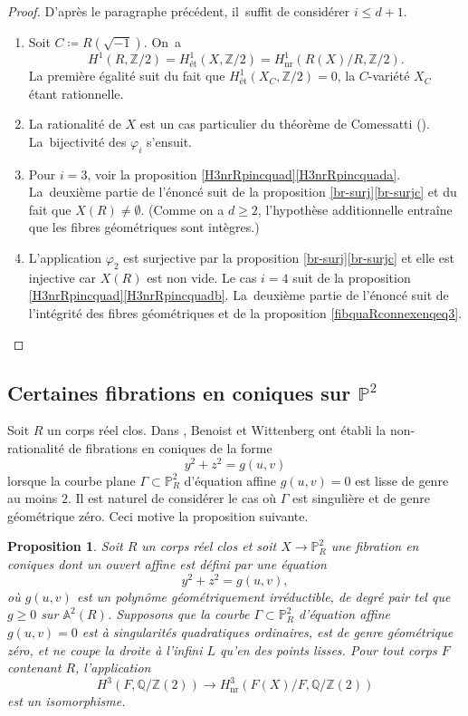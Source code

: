 \documentclass[JEP,XML,SOM,Unicode,francais,published]{cedram}
\newenvironment{enumeratea}
{\bgroup\def\theenumi{\alph{enumi}}\begin{enumerate}}
{\end{enumerate}\egroup}
\newtheorem{prop}[thm]{Proposition}
\theoremstyle{definition}
\newcommand{\Q}{\mathbb Q}
\newcommand{\Z}{\mathbb Z}
\newcommand{\A}{\mathbb A}
\renewcommand{\P}{\mathbb P}
\newcommand{\on}[1]{\operatorname{#1}}
\let\phi\varphi
\begin{document}
\begin{proof}
D'après le paragraphe précédent, il~suffit de considérer $i\leq d+1$.

\begin{enumeratea}
\item\label{pf:a}
Soit $C\coloneqq R(\sqrt{-1})$. On~a
\[H^1(R,\Z/2)=H^1_{\text{ét}}(X,\Z/2)=H^1_{\on{nr}}(R(X)/R,\Z/2).\]
La première égalité suit du fait que $H^1_{\text{ét}}(X_C,\Z/2)=0$, la $C$-variété $X_C$ étant rationnelle.

\item\label{pf:b}
La rationalité de $X$ est un cas particulier du théorème de Comessatti \cite{comessatti1912fondamenti} (\cf \cite[\S10.2]{colliot2024certaines}). La~bijectivité des $\phi_i$ s'ensuit.

\item\label{pf:c}
Pour $i=3$, voir la proposition \ref{H3nrRpincquad}\eqref{H3nrRpincquada}. La~deuxième partie de l'énoncé suit de la proposition \ref{br-surj}\eqref{br-surjc} et du fait que $X(R)\neq \emptyset$. (Comme on a $d\geq 2$, l'hypothèse additionnelle entraîne que les fibres géométriques sont intègres.)

\item\label{pf:d}
L'application $\phi_2$ est surjective par la proposition \ref{br-surj}\eqref{br-surjc} et elle est injective car $X(R)$ est non vide. Le cas $i=4$ suit de la proposition \ref{H3nrRpincquad}\eqref{H3nrRpincquadb}. La~deuxième partie de l'énoncé suit de l’intégrité des fibres géométriques et de la proposition \ref{fibquaRconnexenqeq3}.\qedhere
\end{enumeratea}
\end{proof}

\subsection{Certaines fibrations en coniques sur \texorpdfstring{$\P^2$}{P2}}
Soit $R$ un corps réel clos. Dans \cite[Prop.\,3.4, Cor.\,3.6]{benoist2020clemens}, Benoist et Wittenberg ont établi la non-rationalité de fibrations en coniques de la forme
\[
y^2+z^2=g(u,v)
\]
lorsque la courbe plane $\Gamma\subset \P^2_R$ d'équation affine $g(u,v)=0$ est lisse de genre au moins $2$. Il est naturel de considérer le cas où $\Gamma$ est singulière et de genre géométrique zéro. Ceci motive la proposition suivante.

\begin{prop}\label{BeWi}
Soit $R$ un corps réel clos et soit $X \to \P^2_{R}$ une fibration en coniques dont un ouvert affine est
défini par une équation
\[
y^2+z^2=g(u,v),
\]
où $g(u,v)$ est un polynôme géométriquement irréductible,
de degré pair tel que $g\geq 0$ sur $\A^2(R)$.
Supposons que la courbe $\Gamma \subset \P^2_R$ d'équation affine $g(u,v)=0$ est à singularités quadratiques ordinaires, est de genre géométrique zéro, et ne coupe la droite
à l'infini $L$ qu'en des points lisses. Pour tout corps $F$ contenant $R$,
l'application
\[
H^3(F,\Q/\Z(2)) \to H^3_{\on{nr}}(F(X)/F,\Q/\Z(2))
\]
est un isomorphisme.
\end{prop}
\end{document}
